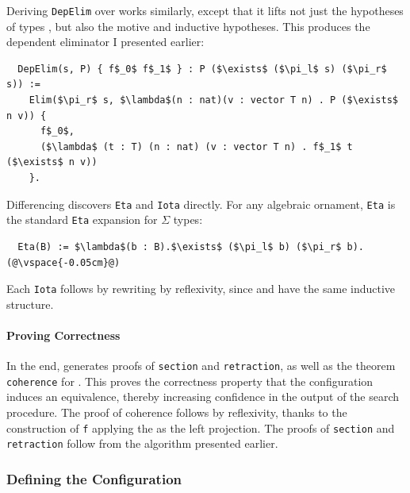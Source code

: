 Deriving \lstinline{DepElim} over \B works similarly, except that it lifts not just the hypotheses of types \Aa, but 
also the motive and inductive hypotheses.
This produces the dependent eliminator I presented earlier:

\begin{lstlisting}
  DepElim(s, P) { f$_0$ f$_1$ } : P ($\exists$ ($\pi_l$ s) ($\pi_r$ s)) :=
    Elim($\pi_r$ s, $\lambda$(n : nat)(v : vector T n) . P ($\exists$ n v)) {
      f$_0$,
      ($\lambda$ (t : T) (n : nat) (v : vector T n) . f$_1$ t ($\exists$ n v))
    }.
\end{lstlisting}

Differencing discovers \lstinline{Eta} and \lstinline{Iota} directly.
For any algebraic ornament, \lstinline{Eta} is the standard \lstinline{Eta} expansion for $\Sigma$ types:

\begin{lstlisting}
  Eta(B) := $\lambda$(b : B).$\exists$ ($\pi_l$ b) ($\pi_r$ b).(@\vspace{-0.05cm}@)
\end{lstlisting}
Each \lstinline{Iota} follows by rewriting by reflexivity, since \Aa and \AI have the same inductive structure.

\paragraph{Proving Correctness}
In the end, \toolnamec generates proofs of \lstinline{section} and \lstinline{retraction},
as well as the  theorem \lstinline{coherence} for .
This proves the correctness property that the configuration induces an equivalence, thereby
increasing confidence in the output of the search procedure.
The proof of coherence follows by reflexivity, thanks to the construction of \lstinline{f} 
applying the  as the left projection.
The proofs of \lstinline{section} and \lstinline{retraction} follow from the algorithm presented earlier.

\iffalse
\subsubsection{Defining the Configuration}
\label{sec:config}

